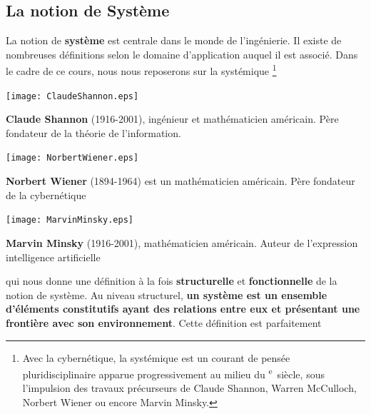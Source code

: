 \subsection{La notion de Système}
La notion de \textbf{système} est centrale dans le monde de l'ingénierie.
Il existe de nombreuses définitions selon le domaine 
d'application auquel il est associé. Dans le cadre de ce cours, nous nous 
reposerons sur la systémique \footnote{Avec la cybernétique, la systémique est 
un courant de pensée pluridisciplinaire apparue progressivement au milieu du 
\textsc{}\textsuperscript{e}~siècle, sous l'impulsion des 
travaux précurseurs de Claude Shannon, 
Warren McCulloch, 
Norbert Wiener 
ou encore Marvin Minsky.} 
\begin{marginfigure}
    \centering
    \texttt{[image: ClaudeShannon.eps]}
    \caption*{\textbf{Claude Shannon} (1916-2001), ingénieur et 
              mathématicien américain. 
              Père fondateur de la théorie de l'information.}
\end{marginfigure}
\begin{marginfigure}
    \centering
    \texttt{[image: NorbertWiener.eps]}
    \caption*{\textbf{Norbert Wiener} (1894-1964) est un mathématicien 
              américain. Père fondateur de la cybernétique}
\end{marginfigure}
\begin{marginfigure}
    \centering
    \texttt{[image: MarvinMinsky.eps]}
    \caption*{\textbf{Marvin Minsky} (1916-2001), mathématicien américain. 
              Auteur de l'expression \og intelligence artificielle\fg}
\end{marginfigure}
qui nous donne une définition à la fois \textbf{structurelle} et 
\textbf{fonctionnelle} de la notion de système.
Au niveau structurel, \textbf{un système est un ensemble 
d'éléments constitutifs ayant des relations entre eux et présentant  
une frontière avec son environnement}. Cette définition est parfaitement
